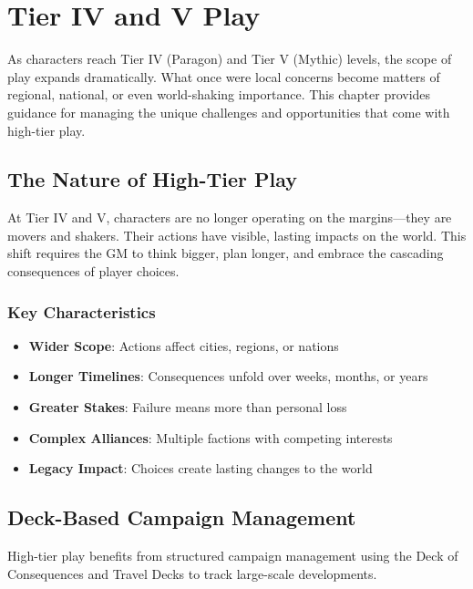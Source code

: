 
\chapter{Tier IV and V Play}

As characters reach Tier IV (Paragon) and Tier V (Mythic) levels, the scope of play expands dramatically. What once were local concerns become matters of regional, national, or even world-shaking importance. This chapter provides guidance for managing the unique challenges and opportunities that come with high-tier play.

\section{The Nature of High-Tier Play}

At Tier IV and V, characters are no longer operating on the margins—they are movers and shakers. Their actions have visible, lasting impacts on the world. This shift requires the GM to think bigger, plan longer, and embrace the cascading consequences of player choices.

\subsection*{Key Characteristics}

\begin{itemize}
    \item \textbf{Wider Scope}: Actions affect cities, regions, or nations
    \item \textbf{Longer Timelines}: Consequences unfold over weeks, months, or years
    \item \textbf{Greater Stakes}: Failure means more than personal loss
    \item \textbf{Complex Alliances}: Multiple factions with competing interests
    \item \textbf{Legacy Impact}: Choices create lasting changes to the world
\end{itemize}

\section{Deck-Based Campaign Management}

High-tier play benefits from structured campaign management using the Deck of Consequences and Travel Decks to track large-scale developments.

